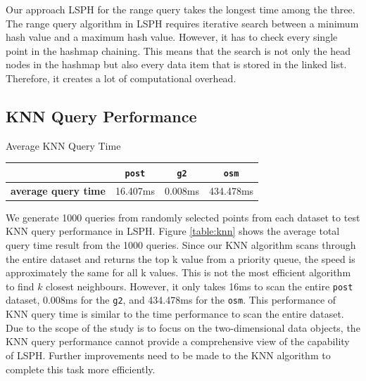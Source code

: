 Our approach LSPH for the range query takes the longest time among the three. The range query algorithm in LSPH requires iterative search between a minimum hash value and a maximum hash value. However, it has to check every single point in the hashmap chaining. This means that the search is not only the head nodes in the hashmap but also every data item that is stored in the linked list. Therefore, it creates a lot of computational overhead. 

\subsection{KNN Query Performance}

\begin{center}
\begin{adjustbox}{max width={\textwidth}, max totalheight={\textheight},keepaspectratio}
\begin{threeparttable}
\caption{Average KNN Query Time}
\begin{tabular}{c|c c c}
    \toprule
                                    &\texttt{post}      & \texttt{g2} & \texttt{osm}             \\ \midrule 
    \textbf{average query time}       & 16.407ms & 0.008ms  & 434.478ms   \\
    \bottomrule
\end{tabular}
\end{threeparttable}
\label{table:knn}
\end{adjustbox}
\end{center}
We generate 1000 queries from randomly selected points from each dataset to test KNN query performance in LSPH. Figure \ref{table:knn} shows the average total query time result from the 1000 queries. Since our KNN algorithm scans through the entire dataset and returns the top k value from a priority queue, the speed is approximately the same for all k values. This is not the most efficient algorithm to find $k$ closest neighbours. However, it only takes 16ms to scan the entire \texttt{post} dataset, 0.008ms for the \texttt{g2}, and 434.478ms for the \texttt{osm}. This performance of KNN query time is similar to the time performance to scan the entire dataset. Due to the scope of the study is to focus on the two-dimensional data objects, the KNN query performance cannot provide a comprehensive view of the capability of LSPH. Further improvements need to be made to the KNN algorithm to complete this task more efficiently. 


